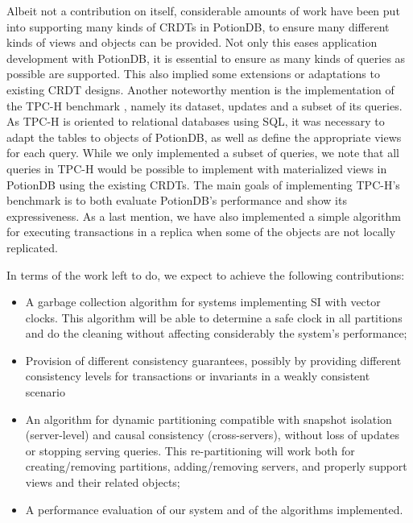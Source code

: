 Albeit not a contribution on itself, considerable amounts of work have been put into supporting many kinds of CRDTs in PotionDB, to ensure many different kinds of views and objects can be provided.
Not only this eases application development with PotionDB, it is essential to ensure as many kinds of queries as possible are supported.
This also implied some extensions or adaptations to existing CRDT designs.
Another noteworthy mention is the implementation of the TPC-H benchmark \cite{tpch}, namely its dataset, updates and a subset of its queries.
As TPC-H is oriented to relational databases using SQL, it was necessary to adapt the tables to objects of PotionDB, as well as define the appropriate views for each query.
While we only implemented a subset of queries, we note that all queries in TPC-H would be possible to implement with materialized views in PotionDB using the existing CRDTs.
The main goals of implementing TPC-H's benchmark is to both evaluate PotionDB's performance and show its expressiveness.
As a last mention, we have also implemented a simple algorithm for executing transactions in a replica when some of the objects are not locally replicated.


In terms of the work left to do, we expect to achieve the following contributions:

\begin{itemize}
	\item A garbage collection algorithm for systems implementing SI with vector clocks. This algorithm will be able to determine a safe clock in all partitions and do the cleaning without affecting considerably the system's performance;
	\item Provision of different consistency guarantees, possibly by providing different consistency levels for transactions or invariants in a weakly consistent scenario
	\item An algorithm for dynamic partitioning compatible with snapshot isolation (server-level) and causal consistency (cross-servers), without loss of updates or stopping serving queries. This re-partitioning will work both for creating/removing partitions, adding/removing servers, and properly support views and their related objects;
	\item A performance evaluation of our system and of the algorithms implemented.
\end{itemize}

